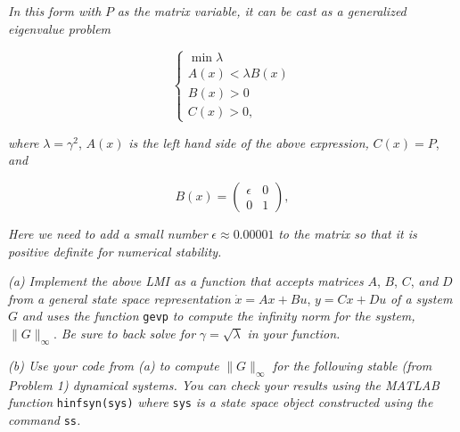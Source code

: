 \documentclass[12pt, letterpaper]{article}
\begin{document}
\textit{In this form with } $P$ \textit{as the matrix variable, it can be cast as a generalized eigenvalue problem}

\[
\begin{cases}
\min \lambda \\
A(x) < \lambda B(x) \\
B(x) > 0 \\
C(x) > 0,
\end{cases}
\]

\textit{where } $\lambda = \gamma^2$, \textit{ } $A(x)$ \textit{ is the left hand side of the above expression, } $C(x) = P$, \textit{ and}

\[
B(x) = 
\begin{pmatrix}
\epsilon & 0 \\
0 & 1
\end{pmatrix},
\]

\textit{Here we need to add a small number } $\epsilon \approx 0.00001$ \textit{ to the matrix so that it is positive definite for numerical stability.}

\textit{(a) Implement the above LMI as a function that accepts matrices } $A$, $B$, $C$, \textit{ and } $D$ \textit{ from a general state space representation } $\dot{x} = Ax + Bu$, $y = Cx + Du$ \textit{ of a system } $G$ \textit{ and uses the function } \texttt{gevp} \textit{ to compute the infinity norm for the system, } $\|G\|_{\infty}$. \textit{ Be sure to back solve for } $\gamma = \sqrt{\lambda}$ \textit{ in your function.}

\textit{(b) Use your code from (a) to compute } $\|G\|_{\infty}$ \textit{ for the following stable (from Problem 1) dynamical systems. You can check your results using the MATLAB function } \texttt{hinfsyn(sys)} \textit{ where } \texttt{sys} \textit{ is a state space object constructed using the command } \texttt{ss}\textit{.}
\end{document}
